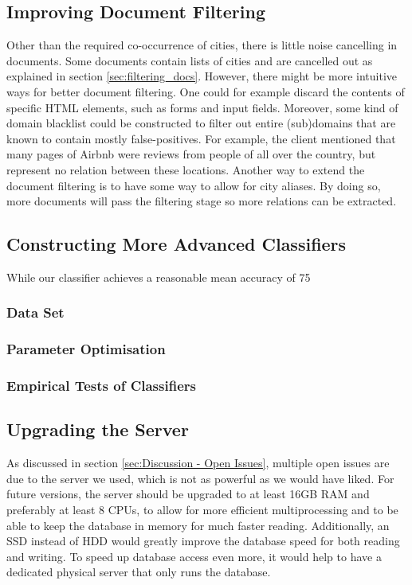 \subsection{Improving Document Filtering}
Other than the required co-occurrence of cities, there is little noise cancelling in documents. Some documents contain lists of cities and are cancelled out as explained in section \ref{sec:filtering_docs}. However, there might be more intuitive ways for better document filtering. One could for example discard the contents of specific HTML elements, such as forms and input fields. Moreover, some kind of domain blacklist could be constructed to filter out entire (sub)domains that are known to contain mostly false-positives. For example, the client mentioned that many pages of Airbnb were reviews from people of all over the country, but represent no relation between these locations. Another way to extend the document filtering is to have some way to allow for city aliases. By doing so, more documents will pass the filtering stage so more relations can be extracted.

\subsection{Constructing More Advanced Classifiers}
While our classifier achieves a reasonable mean accuracy of 75%
\subsubsection{Data Set}
\subsubsection{Parameter Optimisation}
\subsubsection{Empirical Tests of Classifiers}

\subsection{Upgrading the Server}
As discussed in section \ref{sec:Discussion - Open Issues}, multiple open issues are due to the server we used, which is not as powerful as we would have liked. For future versions, the server should be upgraded to at least 16GB RAM and preferably at least 8 CPUs, to allow for more efficient multiprocessing and to be able to keep the database in memory for much faster reading. Additionally, an SSD instead of HDD would greatly improve the database speed for both reading and writing. To speed up database access even more, it would help to have a dedicated physical server that only runs the database.

